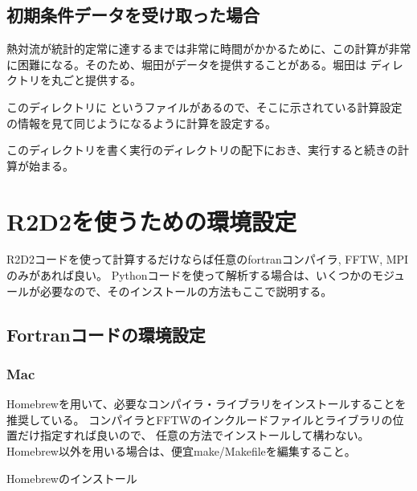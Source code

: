 \documentclass[letterpaper,10pt,dvipdfmx,report]{sphinxmanual}
\begin{document}
\section{初期条件データを受け取った場合}
\label{\detokenize{start:id13}}
熱対流が統計的定常に達するまでは非常に時間がかかるために、この計算が非常に困難になる。そのため、堀田がデータを提供することがある。堀田は  ディレクトリを丸ごと提供する。

このディレクトリに  というファイルがあるので、そこに示されている計算設定の情報を見て同じようになるように計算を設定する。

このディレクトリを書く実行のディレクトリの配下におき、実行すると続きの計算が始まる。


\chapter{R2D2を使うための環境設定}
\label{\detokenize{environment:r2d2}}\label{\detokenize{environment::doc}}
R2D2コードを使って計算するだけならば任意のfortranコンパイラ, FFTW, MPIのみがあれば良い。
Pythonコードを使って解析する場合は、いくつかのモジュールが必要なので、そのインストールの方法もここで説明する。


\section{Fortranコードの環境設定}
\label{\detokenize{environment:fortran}}

\subsection{Mac}
\label{\detokenize{environment:mac}}
Homebrewを用いて、必要なコンパイラ・ライブラリをインストールすることを推奨している。
コンパイラとFFTWのインクルードファイルとライブラリの位置だけ指定すれば良いので、
任意の方法でインストールして構わない。Homebrew以外を用いる場合は、便宜make/Makefileを編集すること。

Homebrewのインストール

\begin{sphinxVerbatim}[commandchars=\\\{\}]
  
\end{sphinxVerbatim}
\end{document}
